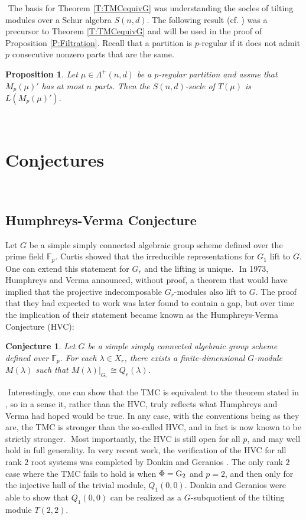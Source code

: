 \documentclass[twoside,11pt,reqno]{amsart}
\newcommand{\0}{\bar 0}
\newcommand{\1}{\bar 1}
\newcommand{\la}{\lambda}
\newtheorem{prop}{Proposition}[subsection]
\newtheorem{conj}{Conjecture}[subsection]
\theoremstyle{definition}
\numberwithin{equation}{subsection}
\begin{document}
﻿
The basis for Theorem \ref{T:TMCequivG} was understanding the socles of tilting modules over a Schur algebra $S(n,d)$.   The following result (cf. \cite[Corollary 4.4.3]{BNPS26}) was a precursor to Theorem \ref{T:TMCequivG} and will be used in the proof of Proposition \ref{P:Filtration}. Recall that a partition is $p$-regular if it does not admit $p$ consecutive nonzero parts that are the same.  

\begin{prop}\label{P:socle} Let $\mu \in \Lambda^+(n,d)$ be a $p$-regular partition and assme that $M_p(\mu)'$ has at most $n$ parts. Then the $S(n,d)$-socle of $T(\mu)$ is $L(M_p(\mu)')$.
\end{prop}
﻿
﻿
\section{Conjectures} \label{S:conjectures}
﻿
\subsection{Humphreys-Verma Conjecture}\label{SS:HVC} Let $G$ be a simple simply connected algebraic group scheme defined over the prime field ${\mathbb F}_{p}$. Curtis \cite{C60} showed that the irreducible 
representations for $G_{1}$ lift to $G$. One can extend this statement for $G_{r}$ and the lifting is unique. 
﻿
In 1973, Humphreys and Verma \cite{HV73} announced, without proof, a theorem that would have implied that the projective indecomposable $G_{r}$-modules also lift to $G$.  The proof that they had expected to work was later found to contain a gap, but over time the implication of their statement became known as the Humphreys-Verma Conjecture (HVC): 
﻿
\begin{conj} Let $G$ be a simple simply connected algebraic group scheme defined over ${\mathbb F}_{p}$.  For each $\la \in X_r$, there exists a finite-dimensional $G$-module $M(\lambda)$ such that $M(\lambda)|_{G_{r}}\cong Q_{r}(\lambda)$. 
\end{conj} 
﻿
Interestingly, one can show that the TMC is equivalent to the theorem stated in \cite{HV73}, so in a sense it, rather than the HVC, truly reflects what Humphreys and Verma had hoped would be true.  In any case, with the conventions being as they are, the TMC is stronger than the so-called HVC, and in fact is now known to be strictly stronger.
﻿
Most importantly, the HVC is still open for all $p$, and may well hold in full generality.  In very recent work, the verification of the HVC for all rank $2$ root systems was completed by Donkin and Geranios \cite{DG26}.  The only rank $2$ case where the TMC fails to hold is when $\Phi = \rm{G}_2$ and $p = 2$, and then only for the injective hull of the trivial module, $Q_1(0,0)$.  Donkin and Geranios were able to show that $Q_{1}(0,0)$ can be realized as a $G$-subquotient of the tilting module $T(2,2)$. 
﻿
﻿
\end{document}
